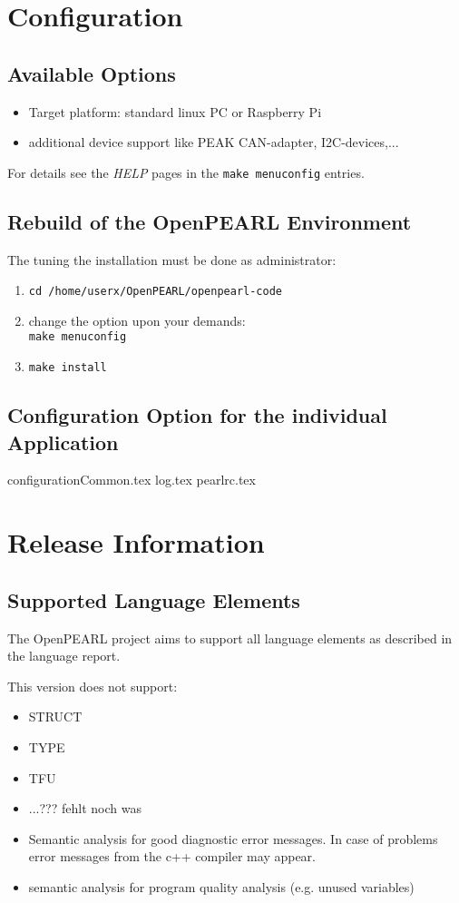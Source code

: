\documentclass[10pt]{scrbook}
\begin{document}
\chapter{Configuration}
\section{Available Options}
\begin{itemize}
\item Target platform: standard linux PC or Raspberry Pi
\item additional device support like PEAK CAN-adapter, I2C-devices,...
\end{itemize}
For details see the {\em HELP} pages in the \verb|make menuconfig| 
entries.

\section{Rebuild of the OpenPEARL Environment}
The tuning the installation must be done as administrator:
\begin{enumerate}
\item \verb|cd /home/userx/OpenPEARL/openpearl-code|
\item change the option upon your demands:\\
      \verb|make menuconfig| 
\item \verb|make install|
\end{enumerate}

\section{Configuration Option for the individual Application}
{configurationCommon.tex}
{log.tex}
{pearlrc.tex}

\chapter{Release Information}
\section{Supported Language Elements}
The OpenPEARL project aims to support all language elements  as
described in the language report.

This version does not support:
\begin{itemize}
\item STRUCT
\item TYPE
\item TFU  
\item ...??? fehlt noch was
\item Semantic analysis for good diagnostic error messages.
     In case of problems error messages from the c++ compiler may appear. 
\item semantic analysis for program quality analysis (e.g. unused variables)
\end{itemize}
\end{document}
